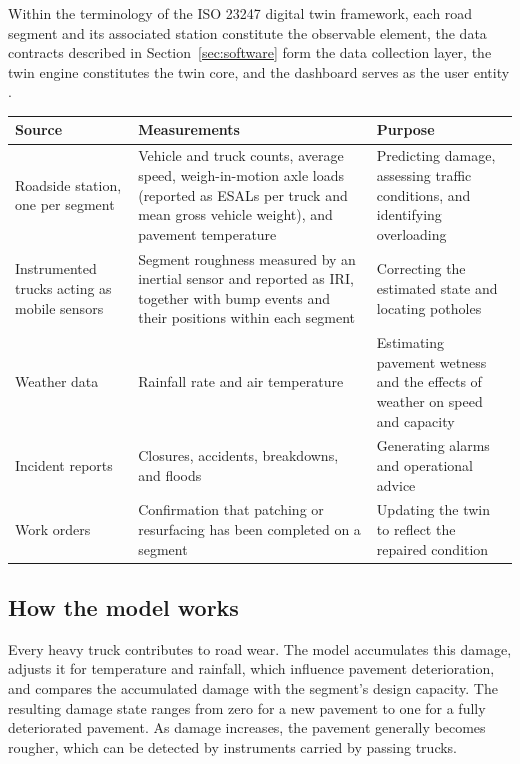 \documentclass[11pt,a4paper]{article}
\renewcommand{\arraystretch}{1.35}
\begin{document}
Within the terminology of the ISO 23247 digital twin framework, each road segment and its associated station constitute the observable element, the data contracts described in Section~\ref{sec:software} form the data collection layer, the twin engine constitutes the twin core, and the dashboard serves as the user entity \cite{iso23247}.

\renewcommand{\arraystretch}{1.7}
\begin{center}
\small
\begin{tabularx}{\textwidth}{@{}L{3.6cm} X L{3.7cm}@{}}
\toprule
\textbf{Source} & \textbf{Measurements} & \textbf{Purpose}\\
\midrule
Roadside station, one per segment & Vehicle and truck counts, average speed, weigh-in-motion axle loads (reported as ESALs per truck and mean gross vehicle weight), and pavement temperature & Predicting damage, assessing traffic conditions, and identifying overloading\\[10pt]
Instrumented trucks acting as mobile sensors & Segment roughness measured by an inertial sensor and reported as IRI, together with bump events and their positions within each segment & Correcting the estimated state and locating potholes\\[10pt]
Weather data & Rainfall rate and air temperature & Estimating pavement wetness and the effects of weather on speed and capacity\\[10pt]
Incident reports & Closures, accidents, breakdowns, and floods & Generating alarms and operational advice\\[10pt]
Work orders & Confirmation that patching or resurfacing has been completed on a segment & Updating the twin to reflect the repaired condition\\
\bottomrule
\end{tabularx}
\end{center}
\renewcommand{\arraystretch}{1.35}

\subsection{How the model works}
Every heavy truck contributes to road wear. The model accumulates this damage, adjusts it for temperature and rainfall, which influence pavement deterioration, and compares the accumulated damage with the segment's design capacity. The resulting damage state ranges from zero for a new pavement to one for a fully deteriorated pavement. As damage increases, the pavement generally becomes rougher, which can be detected by instruments carried by passing trucks.
\end{document}
